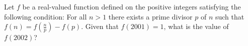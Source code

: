Let $f$ be a real-valued function defined on the positive integers satisfying the following condition: For all $n>1$ there exists a prime divisor $p$ of $n$ such that $f(n)=f\left(\frac{n}{p}\right)-f(p)$. Given that $f(2001)=1$,  what is the value of $f(2002)$?
